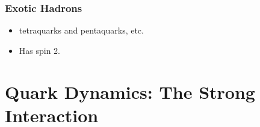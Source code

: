\subsubsection{Exotic Hadrons}
\begin{itemize}
    \item tetraquarks and pentaquarks, etc. 
    \item Has spin 2. 
\end{itemize}



\section{Quark Dynamics: The Strong Interaction}
